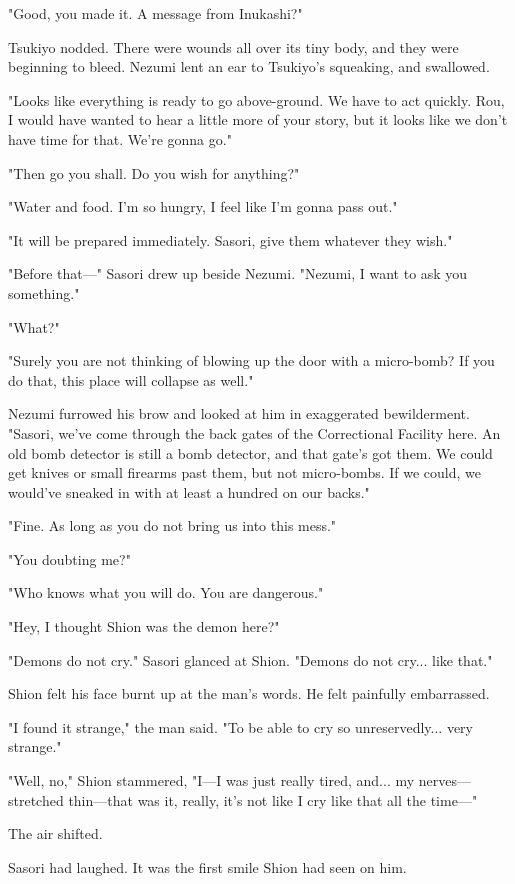 "Good, you made it. A message from Inukashi?"

Tsukiyo nodded. There were wounds all over its tiny body, and they were
beginning to bleed. Nezumi lent an ear to Tsukiyo's squeaking, and
swallowed.

"Looks like everything is ready to go above-ground. We have to act
quickly. Rou, I would have wanted to hear a little more of your story,
but it looks like we don't have time for that. We're gonna go."

"Then go you shall. Do you wish for anything?"

"Water and food. I'm so hungry, I feel like I'm gonna pass out."

"It will be prepared immediately. Sasori, give them whatever they wish."

"Before that---" Sasori drew up beside Nezumi. "Nezumi, I want to ask you
something."

"What?"

"Surely you are not thinking of blowing up the door with a micro-bomb?
If you do that, this place will collapse as well."

Nezumi furrowed his brow and looked at him in exaggerated bewilderment.
"Sasori, we've come through the back gates of the Correctional Facility
here. An old bomb detector is still a bomb detector, and that gate's got
them. We could get knives or small firearms past them, but not
micro-bombs. If we could, we would've sneaked in with at least a hundred
on our backs."

"Fine. As long as you do not bring us into this mess."

"You doubting me?"

"Who knows what you will do. You are dangerous."

"Hey, I thought Shion was the demon here?"

"Demons do not cry." Sasori glanced at Shion. "Demons do not cry... like
that."

Shion felt his face burnt up at the man's words. He felt painfully
embarrassed.

"I found it strange," the man said. "To be able to cry so
unreservedly... very strange."

"Well, no," Shion stammered, "I---I was just really tired, and... my
nerves---stretched thin---that was it, really, it's not like I cry like that
all the time---"

The air shifted.

Sasori had laughed. It was the first smile Shion had seen on him.

